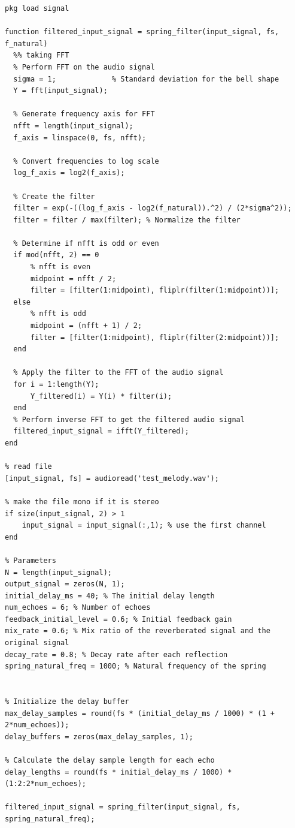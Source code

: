 \documentclass[12pt]{article}
\begin{document}
\begin{lstlisting}
pkg load signal

function filtered_input_signal = spring_filter(input_signal, fs, f_natural)
  %% taking FFT
  % Perform FFT on the audio signal
  sigma = 1;             % Standard deviation for the bell shape
  Y = fft(input_signal);

  % Generate frequency axis for FFT
  nfft = length(input_signal);
  f_axis = linspace(0, fs, nfft);

  % Convert frequencies to log scale
  log_f_axis = log2(f_axis);

  % Create the filter
  filter = exp(-((log_f_axis - log2(f_natural)).^2) / (2*sigma^2));
  filter = filter / max(filter); % Normalize the filter

  % Determine if nfft is odd or even
  if mod(nfft, 2) == 0
      % nfft is even
      midpoint = nfft / 2;
      filter = [filter(1:midpoint), fliplr(filter(1:midpoint))];
  else
      % nfft is odd
      midpoint = (nfft + 1) / 2;
      filter = [filter(1:midpoint), fliplr(filter(2:midpoint))];
  end

  % Apply the filter to the FFT of the audio signal
  for i = 1:length(Y);
      Y_filtered(i) = Y(i) * filter(i);
  end
  % Perform inverse FFT to get the filtered audio signal
  filtered_input_signal = ifft(Y_filtered);
end

% read file
[input_signal, fs] = audioread('test_melody.wav');

% make the file mono if it is stereo
if size(input_signal, 2) > 1
    input_signal = input_signal(:,1); % use the first channel
end

% Parameters
N = length(input_signal);
output_signal = zeros(N, 1);
initial_delay_ms = 40; % The initial delay length
num_echoes = 6; % Number of echoes
feedback_initial_level = 0.6; % Initial feedback gain
mix_rate = 0.6; % Mix ratio of the reverberated signal and the original signal
decay_rate = 0.8; % Decay rate after each reflection
spring_natural_freq = 1000; % Natural frequency of the spring


% Initialize the delay buffer
max_delay_samples = round(fs * (initial_delay_ms / 1000) * (1 + 2*num_echoes));
delay_buffers = zeros(max_delay_samples, 1);

% Calculate the delay sample length for each echo
delay_lengths = round(fs * initial_delay_ms / 1000) * (1:2:2*num_echoes);

filtered_input_signal = spring_filter(input_signal, fs, spring_natural_freq);


\end{lstlisting}
\end{document}

